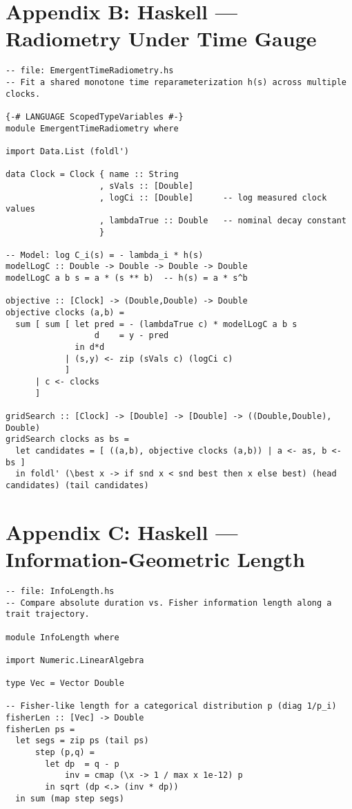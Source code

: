 \documentclass[11pt]{article}
\theoremstyle{definition}
\theoremstyle{plain}
\theoremstyle{remark}
\begin{document}
\section*{Appendix B: Haskell — Radiometry Under Time Gauge}
\begin{lstlisting}
-- file: EmergentTimeRadiometry.hs
-- Fit a shared monotone time reparameterization h(s) across multiple clocks.

{-# LANGUAGE ScopedTypeVariables #-}
module EmergentTimeRadiometry where

import Data.List (foldl')

data Clock = Clock { name :: String
                   , sVals :: [Double]
                   , logCi :: [Double]      -- log measured clock values
                   , lambdaTrue :: Double   -- nominal decay constant
                   }

-- Model: log C_i(s) = - lambda_i * h(s)
modelLogC :: Double -> Double -> Double -> Double
modelLogC a b s = a * (s ** b)  -- h(s) = a * s^b

objective :: [Clock] -> (Double,Double) -> Double
objective clocks (a,b) =
  sum [ sum [ let pred = - (lambdaTrue c) * modelLogC a b s
                  d    = y - pred
              in d*d
            | (s,y) <- zip (sVals c) (logCi c)
            ]
      | c <- clocks
      ]

gridSearch :: [Clock] -> [Double] -> [Double] -> ((Double,Double), Double)
gridSearch clocks as bs =
  let candidates = [ ((a,b), objective clocks (a,b)) | a <- as, b <- bs ]
  in foldl' (\best x -> if snd x < snd best then x else best) (head candidates) (tail candidates)
\end{lstlisting}

\section*{Appendix C: Haskell — Information-Geometric Length}
\begin{lstlisting}
-- file: InfoLength.hs
-- Compare absolute duration vs. Fisher information length along a trait trajectory.

module InfoLength where

import Numeric.LinearAlgebra

type Vec = Vector Double

-- Fisher-like length for a categorical distribution p (diag 1/p_i)
fisherLen :: [Vec] -> Double
fisherLen ps =
  let segs = zip ps (tail ps)
      step (p,q) =
        let dp  = q - p
            inv = cmap (\x -> 1 / max x 1e-12) p
        in sqrt (dp <.> (inv * dp))
  in sum (map step segs)
\end{lstlisting}
\end{document}
